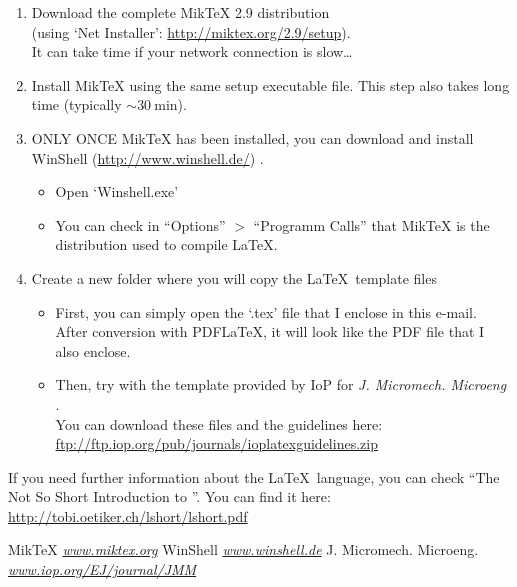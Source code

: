 \documentclass[a4paper]{article}
\begin{document}
\begin{flushleft}
\begin{enumerate}
\item Download the complete MikTeX 2.9 distribution \cite{MikTeX} \\
    (using `Net Installer': \href{http://miktex.org/2.9/setup}{http://miktex.org/2.9/setup}). \\
    It can take time if your network connection is slow\ldots
    
\item Install MikTeX using the same setup executable file.
    This step also takes long time (typically $\sim 30~$min).

\item ONLY ONCE MikTeX has been installed, you can download and install WinShell (\href{http://www.winshell.de/}{http://www.winshell.de/}) \cite{WinShell}.
	\begin{itemize}
    \item  Open `Winshell.exe'
    \item You can check in ``Options'' $>$ ``Programm Calls'' that MikTeX is the distribution used to compile \LaTeX.
	\end{itemize}
	
\item Create a new folder where you will copy  the \LaTeX\ template files 
	\begin{itemize}
	\item First, you can simply open the `.tex' file that I enclose in this e-mail. After conversion with PDFLaTeX, 
	it will look like the PDF file that I also enclose.
	\item Then, try with the template provided by IoP for \emph{J. Micromech. Microeng} \cite{JMM}. \\
    You can download these files and the guidelines here: \\
	\href{ftp://ftp.iop.org/pub/journals/ioplatexguidelines.zip}{ftp://ftp.iop.org/pub/journals/ioplatexguidelines.zip} \\
	\end{itemize}
\end{enumerate}
\end{flushleft}
If you need further information about the \LaTeX\ language, you can check 
``The Not So Short Introduction to \LaTeXe''. You can find it here: \\
	\indent \href{http://tobi.oetiker.ch/lshort/lshort.pdf}{http://tobi.oetiker.ch/lshort/lshort.pdf}


\begin{thebibliography}{10}
 MikTeX {\emph{\href{http://www.miktex.org/}{www.miktex.org}  } }
 WinShell {\emph{\href{http://www.winshell.de/}{www.winshell.de}}}
 J. Micromech. Microeng. {\emph{\href{http://www.iop.org/EJ/journal/JMM/}{www.iop.org/EJ/journal/JMM}} } 
\end{thebibliography}
\end{document}
